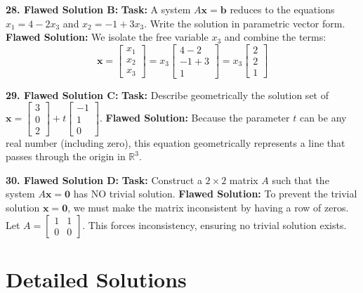 \documentclass[12pt]{article}
\begin{document}
\textbf{28. Flawed Solution B:}
\textbf{Task:} A system $A\mathbf{x} = \mathbf{b}$ reduces to the equations $x_1 = 4 - 2x_3$ and $x_2 = -1 + 3x_3$. Write the solution in parametric vector form.
\textbf{Flawed Solution:} We isolate the free variable $x_3$ and combine the terms:
$$ \mathbf{x} = \begin{bmatrix} x_1 \\ x_2 \\ x_3 \end{bmatrix} = x_3 \begin{bmatrix} 4 - 2 \\ -1 + 3 \\ 1 \end{bmatrix} = x_3 \begin{bmatrix} 2 \\ 2 \\ 1 \end{bmatrix} $$

\textbf{29. Flawed Solution C:}
\textbf{Task:} Describe geometrically the solution set of $\mathbf{x} = \begin{bmatrix} 3 \\ 0 \\ 2 \end{bmatrix} + t \begin{bmatrix} -1 \\ 1 \\ 0 \end{bmatrix}$.
\textbf{Flawed Solution:} Because the parameter $t$ can be any real number (including zero), this equation geometrically represents a line that passes through the origin in $\mathbb{R}^3$.

\textbf{30. Flawed Solution D:}
\textbf{Task:} Construct a $2 \times 2$ matrix $A$ such that the system $A\mathbf{x} = \mathbf{0}$ has NO trivial solution.
\textbf{Flawed Solution:} To prevent the trivial solution $\mathbf{x} = \mathbf{0}$, we must make the matrix inconsistent by having a row of zeros. Let $A = \begin{bmatrix} 1 & 1 \\ 0 & 0 \end{bmatrix}$. This forces inconsistency, ensuring no trivial solution exists.

\newpage

\section{Detailed Solutions}
\end{document}
